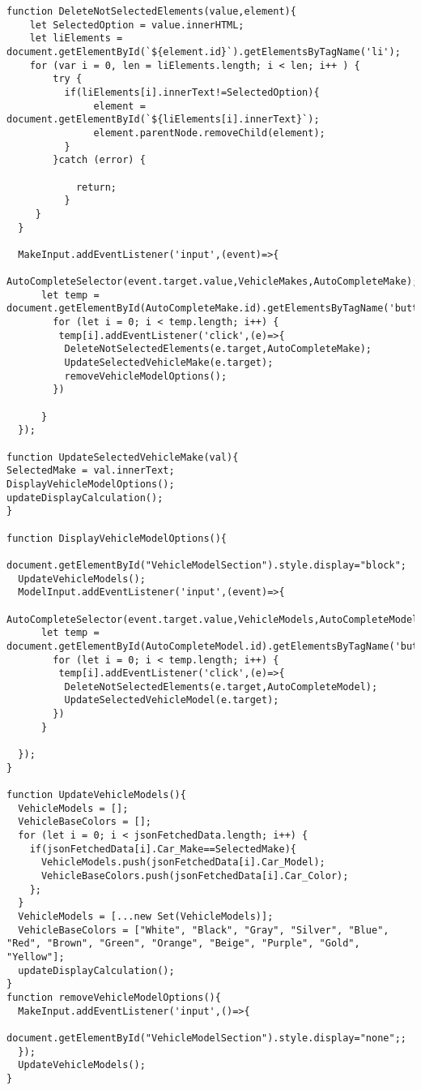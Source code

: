\begin{lstlisting}[style=htmlcssjs]
  function DeleteNotSelectedElements(value,element){
    let SelectedOption = value.innerHTML;
    let liElements = document.getElementById(`${element.id}`).getElementsByTagName('li');
    for (var i = 0, len = liElements.length; i < len; i++ ) {
        try {
          if(liElements[i].innerText!=SelectedOption){
               element = document.getElementById(`${liElements[i].innerText}`);
               element.parentNode.removeChild(element);
          }
        }catch (error) {

            return;
          }     
     }
  }

  MakeInput.addEventListener('input',(event)=>{
    AutoCompleteSelector(event.target.value,VehicleMakes,AutoCompleteMake);
      let temp = document.getElementById(AutoCompleteMake.id).getElementsByTagName('button');
        for (let i = 0; i < temp.length; i++) {
         temp[i].addEventListener('click',(e)=>{
          DeleteNotSelectedElements(e.target,AutoCompleteMake);
          UpdateSelectedVehicleMake(e.target);
          removeVehicleModelOptions();
        })
       
      }
  });

function UpdateSelectedVehicleMake(val){
SelectedMake = val.innerText;
DisplayVehicleModelOptions();
updateDisplayCalculation();
}

function DisplayVehicleModelOptions(){
  document.getElementById("VehicleModelSection").style.display="block";
  UpdateVehicleModels();
  ModelInput.addEventListener('input',(event)=>{
    AutoCompleteSelector(event.target.value,VehicleModels,AutoCompleteModel);
      let temp = document.getElementById(AutoCompleteModel.id).getElementsByTagName('button');
        for (let i = 0; i < temp.length; i++) {
         temp[i].addEventListener('click',(e)=>{
          DeleteNotSelectedElements(e.target,AutoCompleteModel);
          UpdateSelectedVehicleModel(e.target);
        })
      }
  
  });
}

function UpdateVehicleModels(){
  VehicleModels = [];
  VehicleBaseColors = [];
  for (let i = 0; i < jsonFetchedData.length; i++) {
    if(jsonFetchedData[i].Car_Make==SelectedMake){
      VehicleModels.push(jsonFetchedData[i].Car_Model);
      VehicleBaseColors.push(jsonFetchedData[i].Car_Color);
    }; 
  }
  VehicleModels = [...new Set(VehicleModels)];
  VehicleBaseColors = ["White", "Black", "Gray", "Silver", "Blue", "Red", "Brown", "Green", "Orange", "Beige", "Purple", "Gold", "Yellow"];
  updateDisplayCalculation();
}
function removeVehicleModelOptions(){
  MakeInput.addEventListener('input',()=>{
    document.getElementById("VehicleModelSection").style.display="none";;
  });
  UpdateVehicleModels();
}


\end{lstlisting}
